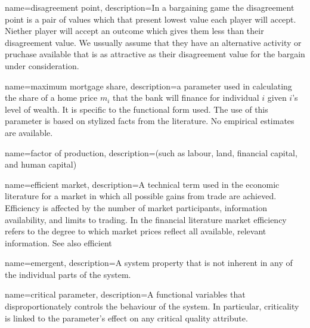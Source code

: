 {
name=disagreement point,
description={In a bargaining game the disagreement point is a pair of values which that present lowest value each player will accept. Niether player will accept an outcome which gives them less than their disagreement value. We ussually assume that they have an alternative activity or pruchase available that is as attractive as their disagreement value for the bargain under consideration.  }
}


{
name=maximum mortgage share,
description={a parameter used in calculating the share of a home price $m_i$ that the bank will finance for individual $i$ given $i$'s level of wealth. It is specific to the functional form used. The use of this parameter is based on stylized facts from the literature.  No empirical estimates are available.}
}



{
name=factor of production,
description={(such as labour, land, financial capital,  and human capital)}
}


{
name=efficient market,
description={A technical term used in the economic literature for a market in which all possible gains from trade are achieved. Efficiency is affected by the number of market participants, information availability, and limits to trading. In the financial literature market efficiency refers to the degree to which market prices reflect all available, relevant information. See also \gls{efficient}} %
}



{
name=emergent,
description={A system property that is not inherent in any of the individual parts of the system. %
}
}

{
name=critical parameter,
description={A functional variables that disproportionately controls the behaviour of the system. In particular, criticality is linked to the parameter's effect on any critical quality attribute. %
}
}

